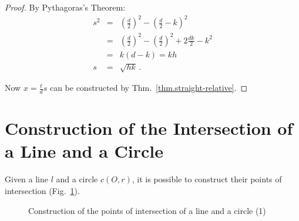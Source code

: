 \begin{proof}
\newpage

By Pythagoras's Theorem:
\begin{eqnarray*}
s^2&=& \left(\frac{d}{2}\right)^2 - \left(\frac{d}{2}-k\right)^2\\
&=& \left(\frac{d}{2}\right)^2 - \left(\frac{d}{2}\right)^2 + 2\frac{dk}{2} - k^2\\
&=& k(d-k) = kh\\
s&=&\sqrt{hk}\,.
\end{eqnarray*}

Now $x=\displaystyle\frac{t}{d}s$ can be constructed by Thm.~\ref{thm.straight-relative}.
\end{proof}

\vspace{-4ex}

\section{Construction of the Intersection of a Line and a Circle}\label{s.line-circle-straight}

\begin{theorem}
Given a line $l$ and a circle $c(O,r)$, it is possible to construct their points of intersection (Fig.~\ref{f.se-line-circle1}).
\end{theorem}
\begin{figure}[b]
\begin{center}
\end{center}
\caption{Construction of the points of intersection of a line and a circle (1)}\label{f.se-line-circle1}
\end{figure}

